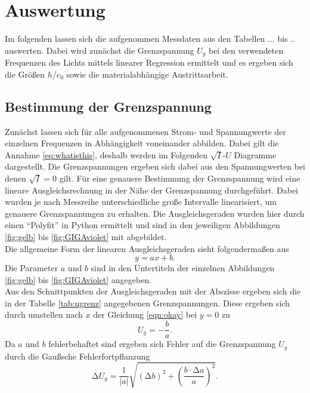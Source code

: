 \section{Auswertung}

Im folgenden lassen sich die aufgenommen Messdaten aus den Tabellen ... bis .. auswerten. Dabei wird zunächst die Grenzspannung $U_{g}$ bei den verwendeten Frequenzen des Lichts mittels linearer Regression ermittelt und es ergeben sich
die Größen $h$/$e_{0}$ sowie die materialabhängige Austrittsarbeit.

\subsection{Bestimmung der Grenzspannung}

Zunächst lassen sich für alle aufgenommenen Strom- und Spannungwerte der einzelnen Frequenzen in Abhängigkeit voneinander abbilden. Dabei gilt die Annahme \eqref{eq:whatisthis}, deshalb werden im Folgenden $\sqrt{I}$-$U$ Diagramme dargestellt.
Die Grenzspannungen ergeben sich dabei aus den Spannungwerten bei denen $\sqrt{I} = 0$ gilt.
Für eine genauere Bestimmung der Grenzspannung wird eine lineare Ausgleichsrechnung in der Nähe der Grenzspannung durchgeführt.  Dabei wurden je nach Messreihe unterschiedliche große
Intervalle linearisiert, um genauere Grenzspannungen zu erhalten. 
Die Ausgleichsgeraden wurden hier durch einen \enquote{Polyfit} in Python \cite{python} ermittelt und sind in den jeweiligen Abbildungen \ref{fig:gelb} bis \ref{fig:GIGAviolet} mit abgebildet.
\\
Die allgemeine Form der linearen Ausgleichsgeraden sieht folgendermaßen aus
\begin{equation}
    \label{eqn:okay}
y = ax + b.
\end{equation}
Die Parameter $a$ und $b$ sind in den Untertiteln der einzelnen Abbildungen \ref{fig:gelb} bis \ref{fig:GIGAviolet} angegeben.
\\
Aus den Schnittpunkten der Ausgleichsgeraden mit der Abszisse ergeben sich die in der Tabelle \ref{tab:ugrenz} angegebenen Grenzspannungen.
Diese ergeben sich durch umstellen nach $x$ der Gleichung \eqref{eqn:okay} bei $y = 0$ zu 
\begin{equation*}
U_g = -\frac{b}{a}.
\end{equation*}
Da $a$ und $b$ fehlerbehaftet sind ergeben sich Fehler auf die Grenzspannung $U_g$ durch die Gaußsche Fehlerfortpflanzung
\begin{equation*}
\increment U_g = \frac{1}{|a|} \sqrt{(\increment b)^2 + \left( \frac{b \cdot \increment a}{a}\right)^2}.
\end{equation*}
